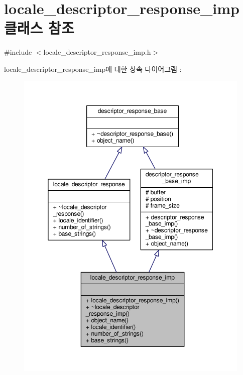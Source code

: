 \hypertarget{classavdecc__lib_1_1locale__descriptor__response__imp}{}\section{locale\+\_\+descriptor\+\_\+response\+\_\+imp 클래스 참조}
\label{classavdecc__lib_1_1locale__descriptor__response__imp}


{\ttfamily \#include $<$locale\+\_\+descriptor\+\_\+response\+\_\+imp.\+h$>$}



locale\+\_\+descriptor\+\_\+response\+\_\+imp에 대한 상속 다이어그램 \+: 
\nopagebreak
\begin{figure}[H]
\begin{center}
\leavevmode
\includegraphics[width=350pt]{classavdecc__lib_1_1locale__descriptor__response__imp__inherit__graph}
\end{center}
\end{figure}


